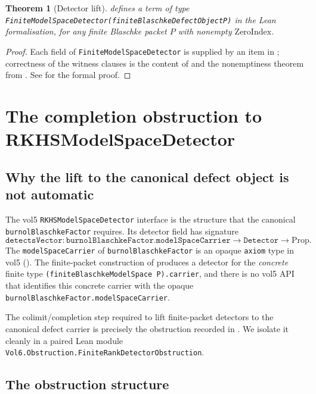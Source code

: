 \documentclass[12pt]{article}
\newtheorem{theorem}{Theorem}[section]
\theoremstyle{definition}
\theoremstyle{remark}
\begin{document}
\begin{theorem}[Detector lift]\label{thm:detector-lift}
 defines a term of type
\texttt{FiniteModelSpaceDetector\;(finiteBlaschkeDefectObject\;P)}
in the Lean formalisation, for any finite Blaschke packet $P$ with
nonempty $\mathrm{ZeroIndex}$.
\end{theorem}

\begin{proof}
Each field of \texttt{FiniteModelSpaceDetector} is supplied by an item in
; correctness of the witness clauses is the
content of  and the nonemptiness theorem from
\cite[Paper~01]{Vol6KB}. See  for the formal proof.
\end{proof}

\section{The completion obstruction to RKHSModelSpaceDetector}\label{sec:rkhs-detector}

\subsection{Why the lift to the canonical defect object is not automatic}

The vol5 \texttt{RKHSModelSpaceDetector} interface
\cite[\S2.5]{Vol5KB} is the structure that the canonical
\texttt{burnolBlaschkeFactor} requires. Its detector field has signature
\[
  \texttt{detectsVector}:\texttt{burnolBlaschkeFactor.modelSpaceCarrier}
   \to\texttt{Detector}\to\mathrm{Prop}.
\]
The \texttt{modelSpaceCarrier} of \texttt{burnolBlaschkeFactor} is an opaque
\texttt{axiom} type in vol5 (\cite[RF-01]{Vol6KB}). The finite-packet
construction of  produces a detector for the
\emph{concrete} finite type
\texttt{(finiteBlaschkeModelSpace P).carrier}, and there is no vol5 API
that identifies this concrete carrier with the opaque
\texttt{burnolBlaschkeFactor.modelSpaceCarrier}.

The colimit/completion step required to lift finite-packet detectors to the
canonical defect carrier is precisely the obstruction recorded in
\cite[RF-05]{Vol6KB}. We isolate it cleanly in a paired Lean module
\texttt{Vol6.Obstruction.FiniteRankDetectorObstruction}.

\subsection{The obstruction structure}
\end{document}
